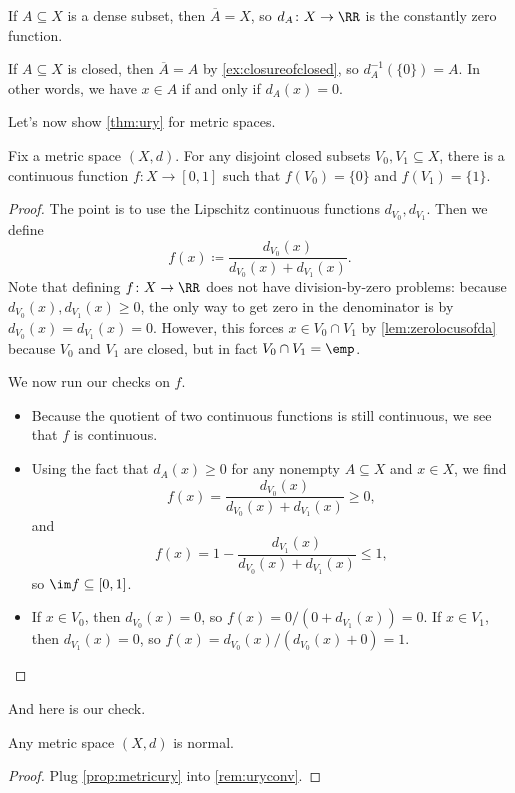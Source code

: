 \documentclass[../notes.tex]{subfiles}
\begin{document}
\begin{example}
	If $A\subseteq X$ is a dense subset, then $\overline A=X$, so $d_A\colon X\to\RR$ is the constantly zero function.
\end{example}
\begin{example}
	If $A\subseteq X$ is closed, then $\overline A=A$ by \autoref{ex:closureofclosed}, so $d_A^{-1}(\{0\})=A$. In other words, we have $x\in A$ if and only if $d_A(x)=0$.
\end{example}
Let's now show \autoref{thm:ury} for metric spaces.
\begin{proposition} \label{prop:metricury}
	Fix a metric space $(X,d)$. For any disjoint closed subsets $V_0,V_1\subseteq X$, there is a continuous function $f\colon X\to[0,1]$ such that $f(V_0)=\{0\}$ and $f(V_1)=\{1\}$.
\end{proposition}
\begin{proof}
	The point is to use the Lipschitz continuous functions $d_{V_0},d_{V_1}$. Then we define
	\[f(x)\coloneqq\frac{d_{V_0}(x)}{d_{V_0}(x)+d_{V_1}(x)}.\]
	Note that defining $f\colon X\to\RR$ does not have division-by-zero problems: because $d_{V_0}(x),d_{V_1}(x)\ge0$, the only way to get zero in the denominator is by $d_{V_0}(x)=d_{V_1}(x)=0$. However, this forces $x\in V_0\cap V_1$ by \autoref{lem:zerolocusofda} because $V_0$ and $V_1$ are closed, but in fact $V_0\cap V_1=\emp$.
	
	We now run our checks on $f$.
	\begin{itemize}
		\item Because the quotient of two continuous functions is still continuous, we see that $f$ is continuous.
		\item Using the fact that $d_A(x)\ge0$ for any nonempty $A\subseteq X$ and $x\in X$, we find
		\[f(x)=\frac{d_{V_0}(x)}{d_{V_0}(x)+d_{V_1}(x)}\ge0,\]
		and
		\[f(x)=1-\frac{d_{V_1}(x)}{d_{V_0}(x)+d_{V_1}(x)}\le1,\]
		so $\im f\subseteq[0,1]$.
		\item If $x\in V_0$, then $d_{V_0}(x)=0$, so $f(x)=0/(0+d_{V_1}(x))=0$. If $x\in V_1$, then $d_{V_1}(x)=0$, so $f(x)=d_{V_0}(x)/(d_{V_0}(x)+0)=1$.
		\qedhere
	\end{itemize}
\end{proof}
And here is our check.
\begin{corollary}
	Any metric space $(X,d)$ is normal.
\end{corollary}
\begin{proof}
	Plug \autoref{prop:metricury} into \autoref{rem:uryconv}.
\end{proof}
\end{document}
